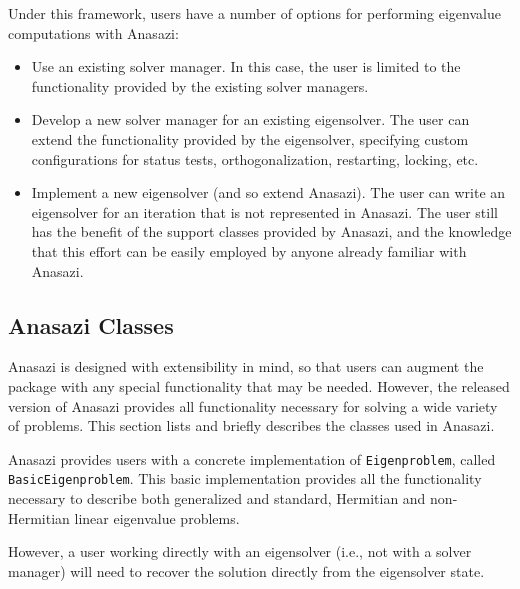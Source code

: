 \documentclass[acmtoms]{acmtrans2m}
\newcommand{\aspace}[1]{\texttt{#1}}
\begin{document}
Under this framework, users have a number of options for performing eigenvalue
computations with Anasazi:
\begin{itemize}
\item
Use an existing solver manager. In this case, the user is limited to
the functionality provided by the existing solver managers.
\item
Develop a new solver manager for an existing eigensolver.
The user can extend the functionality provided by the eigensolver,
specifying custom configurations for status tests,
orthogonalization, restarting, locking,  etc.
\item
Implement a new eigensolver (and so extend Anasazi). The user can
write an eigensolver for an iteration that is not represented in
Anasazi. The user still has the benefit of the support classes
provided by Anasazi, and the knowledge that this effort can be
easily employed by anyone already familiar with Anasazi.
\end{itemize}


\subsection{Anasazi Classes}
\label{subsec:anasazi:classes}

Anasazi is designed with extensibility in mind, so that users can
augment the package with any special functionality that may be
needed. However, the released version of Anasazi provides all
functionality necessary for solving a wide variety of problems. This
section lists and briefly describes the classes used in Anasazi.

Anasazi provides users with a concrete implementation of
\aspace{Eigenproblem}, called \aspace{BasicEigenproblem}. This basic implementation
provides all the functionality necessary to describe both generalized and standard,
Hermitian and non-Hermitian linear eigenvalue problems.

However, a user working
directly with an eigensolver (i.e., not with a solver manager) will need to recover the
solution directly from the eigensolver state.

\end{document}
